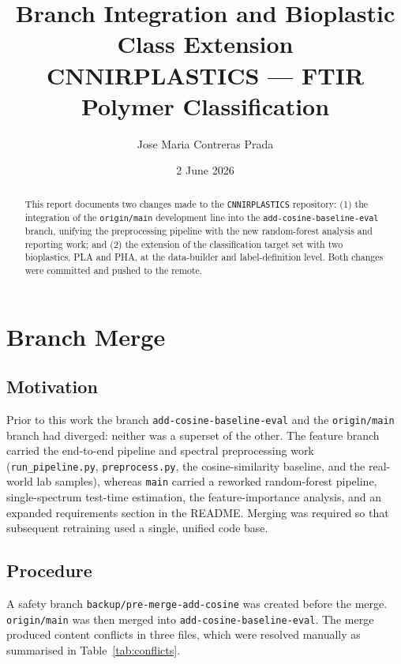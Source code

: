 \documentclass[11pt,a4paper]{article}
\title{\textbf{Branch Integration and Bioplastic Class Extension}\\
\large CNNIRPLASTICS --- FTIR Polymer Classification}
\author{Jose Maria Contreras Prada}
\date{2 June 2026}
\begin{document}
\maketitle

\begin{abstract}
This report documents two changes made to the \texttt{CNNIRPLASTICS} repository:
(1) the integration of the \texttt{origin/main} development line into the
\texttt{add-cosine-baseline-eval} branch, unifying the preprocessing pipeline
with the new random-forest analysis and reporting work; and (2) the extension of
the classification target set with two bioplastics, PLA and PHA, at the
data-builder and label-definition level. Both changes were committed and pushed
to the remote.
\end{abstract}

\tableofcontents
\bigskip

\section{Branch Merge}

\subsection{Motivation}

Prior to this work the branch \texttt{add-cosine-baseline-eval} and the
\texttt{origin/main} branch had diverged: neither was a superset of the other.
The feature branch carried the end-to-end pipeline and spectral preprocessing
work (\texttt{run\_pipeline.py}, \texttt{preprocess.py}, the cosine-similarity
baseline, and the real-world lab samples), whereas \texttt{main} carried a
reworked random-forest pipeline, single-spectrum test-time estimation, the
feature-importance analysis, and an expanded requirements section in the README.
Merging was required so that subsequent retraining used a single, unified code
base.

\subsection{Procedure}

A safety branch \texttt{backup/pre-merge-add-cosine} was created before the
merge. \texttt{origin/main} was then merged into \texttt{add-cosine-baseline-eval}.
The merge produced content conflicts in three files, which were resolved
manually as summarised in Table~\ref{tab:conflicts}.
\end{document}
